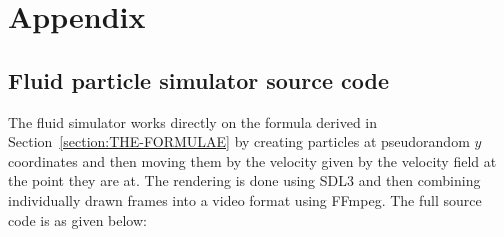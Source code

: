 \section{Appendix}

\subsection{Fluid particle simulator source code}
The fluid simulator works directly on the formula derived in Section~\ref{section:THE-FORMULAE} by creating particles
at pseudorandom $y$ coordinates and then moving them by the velocity given by the velocity field at the point they are at.
The rendering is done using SDL3 and then combining individually drawn frames into a video format using FFmpeg. The full source
code is as given below:
